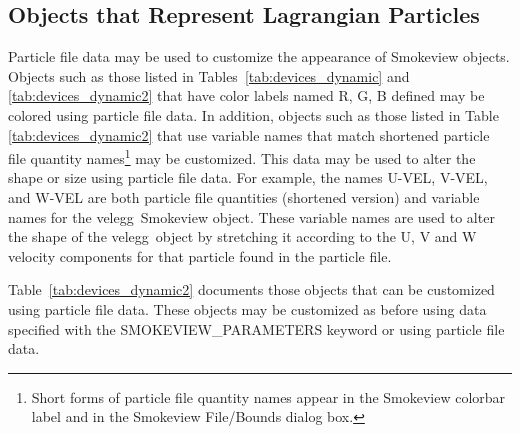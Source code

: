 \subsection{Objects that Represent Lagrangian Particles}
\label{info:SMOKEVIEW_PART}

Particle file data may be used to customize the appearance of Smokeview objects. Objects such as those listed in Tables~\ref{tab:devices_dynamic} and \ref{tab:devices_dynamic2} that have color labels named {\ct R}, {\ct G}, {\ct B} defined may be colored using particle file data.  In addition, objects such as those listed in Table \ref{tab:devices_dynamic2} that use variable names that match shortened particle file quantity names\footnote{Short forms of particle file quantity names appear in the Smokeview colorbar label and in the Smokeview File/Bounds dialog box.} may be customized.  This data may be used to alter the shape or size using particle file data.  For example, the names {\ct U-VEL}, {\ct V-VEL}, and {\ct W-VEL} are both particle file quantities (shortened version) and variable names for the {\ct velegg}\ Smokeview object. These variable names are used to alter the shape of the {\ct velegg}\ object by stretching it according to the U, V and W velocity components for that particle found in the particle file.

Table~\ref{tab:devices_dynamic2} documents those objects that can be customized using particle file data.  These objects may be customized as before using data specified with the {\ct SMOKEVIEW\_PARAMETERS} keyword or using particle file data.

